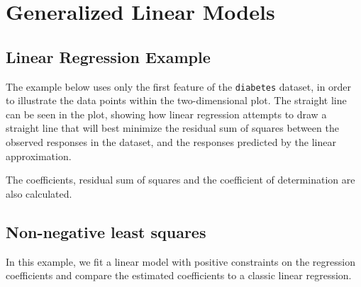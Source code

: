 \chapter{Generalized Linear Models}
\section{Linear Regression Example\label{Linear Regression Example}}
The example below uses only the first feature of the \verb|diabetes| dataset, in order to illustrate the data points within the two-dimensional plot. The straight line can be seen in the plot, showing how linear regression attempts to draw a straight line that will best minimize the residual sum of squares between the observed responses in the dataset, and the responses predicted by the linear approximation.

The coefficients, residual sum of squares and the coefficient of determination are also calculated.


\section{Non-negative least squares\label{Non-negative least squares}}
In this example, we fit a linear model with positive constraints on the regression coefficients and compare the estimated coefficients to a classic linear regression.
